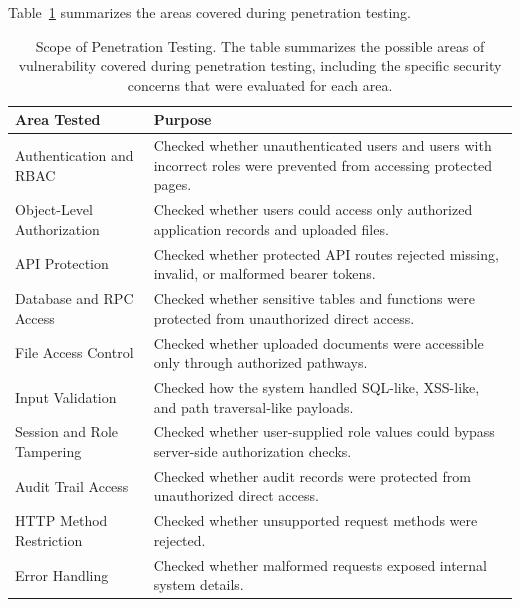 Table~\ref{tab:pentest-scope} summarizes the areas covered during penetration testing.

\begingroup
\setlength{\tabcolsep}{6pt}
\renewcommand{\arraystretch}{1.12}
\small
\begin{table}[H]
\centering
\captionsetup{justification=raggedright,singlelinecheck=false}
\caption[Scope of Penetration Testing]{Scope of Penetration Testing. The table summarizes the possible areas of vulnerability covered during penetration testing, including the specific security concerns that were evaluated for each area.}
\label{tab:pentest-scope}
\begin{tabular}{|p{}|p{}|}
\hline
\textbf{Area Tested} & \textbf{Purpose} \\
\hline
Authentication and RBAC & Checked whether unauthenticated users and users with incorrect roles were prevented from accessing protected pages. \\
\hline
Object-Level Authorization & Checked whether users could access only authorized application records and uploaded files. \\
\hline
API Protection & Checked whether protected API routes rejected missing, invalid, or malformed bearer tokens. \\
\hline
Database and RPC Access & Checked whether sensitive tables and functions were protected from unauthorized direct access. \\
\hline
File Access Control & Checked whether uploaded documents were accessible only through authorized pathways. \\
\hline
Input Validation & Checked how the system handled SQL-like, XSS-like, and path traversal-like payloads. \\
\hline
Session and Role Tampering & Checked whether user-supplied role values could bypass server-side authorization checks. \\
\hline
Audit Trail Access & Checked whether audit records were protected from unauthorized direct access. \\
\hline
HTTP Method Restriction & Checked whether unsupported request methods were rejected. \\
\hline
Error Handling & Checked whether malformed requests exposed internal system details. \\
\hline
\end{tabular}
\end{table}
\endgroup

\FloatBarrier

